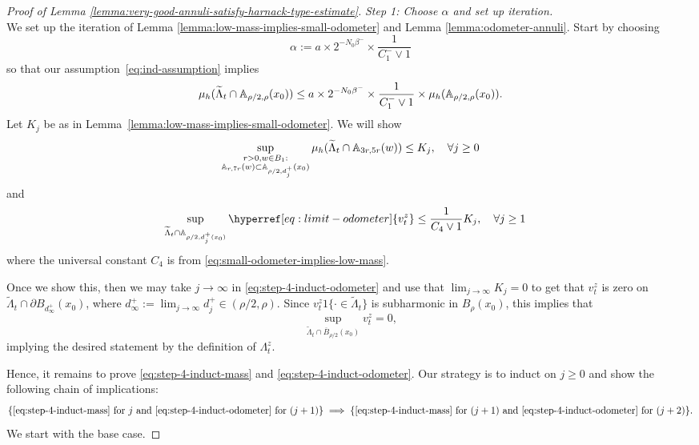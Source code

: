 \documentclass[12pt]{amsart}
\numberwithin{equation}{section}
\newcommand{\cluster}[2]{\hyperref[eq:non-co-set]{\mathit{\Lambda}^{#1}_{#2}}}
\newcommand{\odometer}[2]{\hyperref[eq:limit-odometer]{v^{#1}_{#2}}}
\begin{document}
\begin{proof}[Proof of Lemma \ref{lemma:very-good-annuli-satisfy-harnack-type-estimate}]
		
		
		{\it Step 1: Choose $\alpha$ and set up iteration.}  \\
		We set up the iteration of Lemma \ref{lemma:low-mass-implies-small-odometer} and Lemma \ref{lemma:odometer-annuli}.
		Start by choosing 
		\begin{equation} \label{eq:choice-of-alpha}
		\alpha := a \times 2^{-N_0 \beta^-} \times \frac{1}{C^-_1 \vee 1}
		\end{equation}
		so that our assumption~\eqref{eq:ind-assumption} implies
		\begin{equation} \label{eq:step-4-initial-assumption}
		\mu_h(\widetilde \Lambda_t \cap \mathbb{A}_{\rho/2, \rho}(x_0)) \leq a \times 2^{-N_0 \beta^-} \times \frac{1}{C^-_1 \vee 1}  \times \mu_h(\mathbb{A}_{\rho/2, \rho}(x_0)).
		\end{equation}
		Let $K_j$ be as in Lemma~\ref{lemma:low-mass-implies-small-odometer}. We will show 
		\begin{equation} \label{eq:step-4-induct-mass}
		\sup_{\substack{r > 0 , w \in B_1 : \\ \mathbb{A}_{r, 7r}(w) \subset \mathbb{A}_{\rho/2, d^+_j}(x_0)}}    \mu_h(\widetilde \Lambda_t \cap \mathbb{A}_{3 r, 5r}(w)) \leq K_j, \quad \forall j \geq 0
		\end{equation}
		and
		\begin{equation} \label{eq:step-4-induct-odometer}
		\sup_{\widetilde \Lambda_t \cap \A_{\rho/2, d^+_{j}(x_0)}} \odometer{z}{t} \leq \frac{1}{C_4 \vee 1} K_j, \quad \forall j \geq 1 \quad 
		\end{equation}
		where the universal constant $C_4$ is from \eqref{eq:small-odometer-implies-low-mass}.
		
		Once we show this, then we may take $j \to \infty$ in \eqref{eq:step-4-induct-odometer} and use that $\lim_{j\to \infty} K_j = 0$ to get that $\odometer{z}{t} $ is zero on $\widetilde\Lambda_t \cap \partial B_{d_\infty^+}(x_0)$, where $ d_\infty^+:= \lim_{j\to\infty} d_j^+ \in (\rho/2,\rho)$. 
		Since $\odometer{z}{t} 1\{ \cdot \in {\widetilde \Lambda_t}\}$ is subharmonic in $B_{\rho}(x_0)$, this implies that 
		\begin{equation} \label{eq:zero-odometer-in-inner-ball}
		\sup_{\widetilde \Lambda_t \cap \overline B_{\rho/2}(x_0)} \odometer{z}{t} = 0,
		\end{equation}
		implying the desired statement by the definition of ${\cluster{z}{t}}$.  
		
		
		Hence, it remains to prove \eqref{eq:step-4-induct-mass} and \eqref{eq:step-4-induct-odometer}.
		Our strategy is to induct on $j \geq 0$ and show the following chain of implications:
		\[
		\{ \mbox{\eqref{eq:step-4-induct-mass} for $j$ and \eqref{eq:step-4-induct-odometer} for $(j+1)$} \} \implies 	\{ \mbox{\eqref{eq:step-4-induct-mass} for $(j+1)$ and \eqref{eq:step-4-induct-odometer} for $(j+2)$} \}.
		\]
		We start with the base case.
		

\end{proof}
\end{document}
